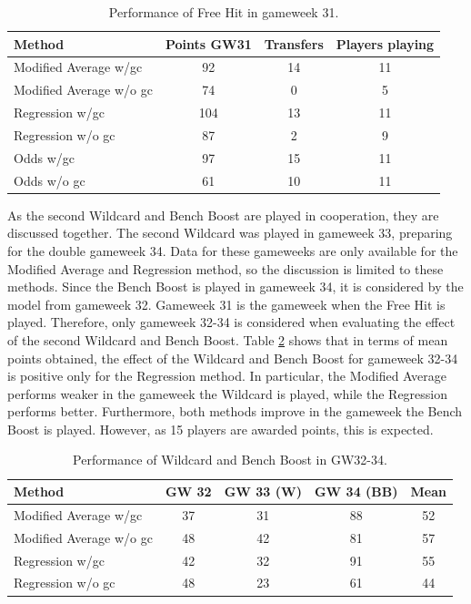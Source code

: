 \begin{table}[H]
\centering
\begin{tabular}{@{}lccc@{}}
\toprule
Method                  & Points GW31 & Transfers  & Players playing \\ \midrule
Modified Average w/gc   & 92          & 14         & 11              \\
Modified Average w/o gc & 74          & 0  & 5               \\
Regression w/gc         & 104         & 13         & 11              \\
Regression w/o gc       & 87          & 2  & 9               \\
Odds w/gc               & 97          & 15         & 11              \\
Odds w/o gc             & 61          & 10  & 11              \\ \bottomrule
\end{tabular}
\caption{Performance of Free Hit in gameweek 31.}
\label{tab:performance_free_hit}
\end{table}


\newpar

As the second Wildcard and Bench Boost are played in cooperation, they are discussed together. The second Wildcard was played in gameweek 33, preparing for the double gameweek 34. Data for these gameweeks are only available for the Modified Average and Regression method, so the discussion is limited to these methods. Since the Bench Boost is played in gameweek 34, it is considered by the model from gameweek 32. Gameweek 31 is the gameweek when the Free Hit is played. Therefore, only gameweek 32-34 is  considered when evaluating the effect of the second Wildcard and Bench Boost. Table \ref{tab:performance_wildcard_and_bench_boost} shows that in terms of mean points obtained, the effect of the Wildcard and Bench Boost for gameweek 32-34 is positive only for the Regression method. In particular, the Modified Average performs weaker in the gameweek the Wildcard is played, while the Regression performs better. Furthermore, both methods improve in the gameweek the Bench Boost is played. However, as 15 players are awarded points, this is expected.


\begin{table}[H]
\centering
\begin{tabular}{@{}lcccc@{}}
\toprule
Method                  & GW 32 & GW 33 (W) & GW 34 (BB) & Mean \\ \midrule
Modified Average w/gc   & 37    & 31        & 88         & 52   \\
Modified Average w/o gc & 48    & 42        & 81         & 57   \\
Regression w/gc         & 42    & 32        & 91         & 55   \\
Regression w/o gc       & 48    & 23        & 61         & 44   \\ \bottomrule
\end{tabular}
\caption{Performance of Wildcard and Bench Boost in GW32-34.}
\label{tab:performance_wildcard_and_bench_boost}
\end{table}






